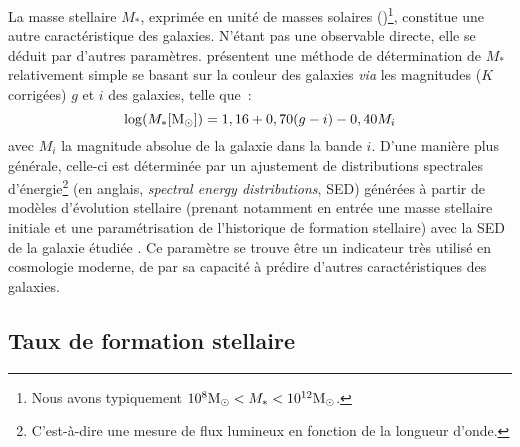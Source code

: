 \documentclass[../main/main.tex]{subfiles}
\begin{document}
La masse stellaire $M_*$, exprimée en unité de masses solaires
(\si{\Msun})\footnote{Nous avons typiquement $10^{8}\si{\Msun} < M_* <
10^{12}\si{\Msun}$.}, constitue une autre caractéristique des galaxies. N'étant
pas une observable directe, elle se déduit par d'autres paramètres.
\cite{taylor2011} présentent une méthode de détermination de $M_*$ relativement
simple se basant sur la couleur des galaxies \textit{via} les magnitudes ($K$
corrigées) $g$ et $i$ des galaxies, telle que~:
\begin{equation}\label{eq:taylor}
    \log(M_* [\si{\Msun}]) = 1,16 + 0,70(g-i) -0,40 M_i
\end{equation}
avec $M_i$ la magnitude absolue de la galaxie dans la bande $i$. D'une manière
plus générale, celle-ci est déterminée par un ajustement de distributions
spectrales d'énergie\footnote{C'est-à-dire une mesure de flux lumineux en
fonction de la longueur d'onde.} (en anglais, \textit{spectral energy
distributions}, SED) générées à partir de modèles d'évolution stellaire (prenant
notamment en entrée une masse stellaire initiale et une paramétrisation de
l'historique de formation stellaire) avec la SED de la galaxie étudiée
\citep{walcher2011}.   Ce paramètre se trouve être un indicateur très utilisé en
cosmologie moderne, de par sa capacité à prédire d'autres caractéristiques des
galaxies.


\subsection{Taux de formation stellaire}\label{ssec:sfrhost}
\end{document}
